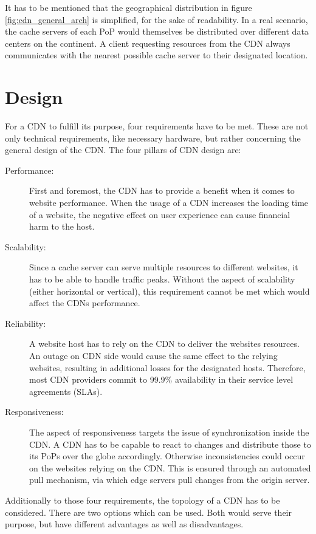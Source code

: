 It has to be mentioned that the geographical distribution in figure \ref{fig:cdn_general_arch} is simplified, for the sake of readability. In a real scenario, the cache servers of each PoP would themselves be distributed over different data centers on the continent. A client requesting resources from the CDN always communicates with the nearest possible cache server to their designated location.\cite{cdn_general}

\section{Design}

For a CDN to fulfill its purpose, four requirements have to be met. These are not only technical requirements, like necessary hardware, but rather concerning the general design of the CDN.
The four pillars of CDN design are:

\begin{description}
	\item[Performance:] First and foremost, the CDN has to provide a benefit when it comes to website performance. When the usage of a CDN increases the loading time of a website, the negative effect on user experience can cause financial harm to the host.\cite{cdn_general}
	\item[Scalability:] Since a cache server can serve multiple resources to different websites, it has to be able to handle traffic peaks. Without the aspect of scalability (either horizontal or vertical), this requirement cannot be met which would affect the CDNs performance.
	\item[Reliability:] A website host has to rely on the CDN to deliver the websites resources. An outage on CDN side would cause the same effect to the relying websites, resulting in additional losses for the designated hosts. Therefore, most CDN providers commit to 99.9\% availability in their service level agreements (SLAs).
	\item[Responsiveness:] The aspect of responsiveness targets the issue of synchronization inside the CDN. A CDN has to be capable to react to changes and distribute those to its PoPs over the globe accordingly. Otherwise inconsistencies could occur on the websites relying on the CDN. This is ensured through an automated pull mechanism, via which edge servers pull changes from the origin server.\cite{cdn_origin_server}
\end{description}

Additionally to those four requirements, the topology of a CDN has to be considered. There are two options which can be used. Both would serve their purpose, but have different advantages as well as disadvantages. 

